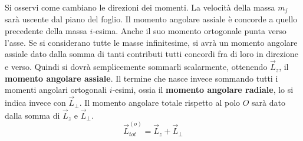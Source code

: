 \documentclass[10pt,a4paper]{book}
\begin{document}
\begin{figure}[htpb]
\end{figure}
\FloatBarrier
Si osservi come cambiano le direzioni dei momenti. La velocità della massa $m_j$ sarà uscente dal piano del foglio. Il momento angolare assiale è concorde a quello precedente della massa $i$-esima. Anche il suo momento ortogonale punta verso l'asse. Se si considerano tutte le masse infinitesime, si avrà un momento angolare assiale dato dalla somma di tanti contributi tutti concordi fra di loro in direzione e verso. Quindi si dovrà semplicemente sommarli scalarmente, ottenendo $\vec{L}_z$, il \textbf{momento angolare assiale}. Il termine che nasce invece sommando tutti i momenti angolari ortogonali $i$-esimi, ossia il \textbf{momento angolare radiale}, lo si indica invece con $\vec{L}_\perp$. Il momento angolare totale rispetto al polo $O$ sarà dato dalla somma di $\vec{L}_z$ e $\vec{L}_\perp$.
\[
	\boxed{\vec{L}_{tot}^{(o)} = \vec{L}_z + \vec{L}_{\bot}}
\]
\end{document}
